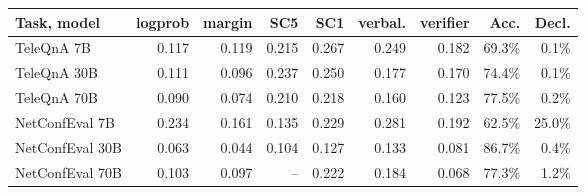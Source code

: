 \begin{tabular}{lrrrrrrrr}
\toprule
Task, model & logprob & margin & SC5 & SC1 & verbal. & verifier & Acc. & Decl. \\
\midrule
TeleQnA 7B & 0.117 & 0.119 & 0.215 & 0.267 & 0.249 & 0.182 & 69.3\% & 0.1\% \\
TeleQnA 30B & 0.111 & 0.096 & 0.237 & 0.250 & 0.177 & 0.170 & 74.4\% & 0.1\% \\
TeleQnA 70B & 0.090 & 0.074 & 0.210 & 0.218 & 0.160 & 0.123 & 77.5\% & 0.2\% \\
NetConfEval 7B & 0.234 & 0.161 & 0.135 & 0.229 & 0.281 & 0.192 & 62.5\% & 25.0\% \\
NetConfEval 30B & 0.063 & 0.044 & 0.104 & 0.127 & 0.133 & 0.081 & 86.7\% & 0.4\% \\
NetConfEval 70B & 0.103 & 0.097 & -- & 0.222 & 0.184 & 0.068 & 77.3\% & 1.2\% \\
\bottomrule
\end{tabular}
